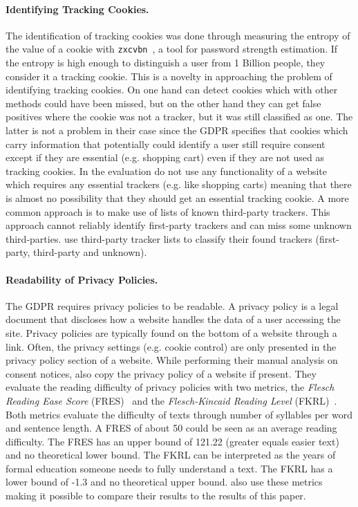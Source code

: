 \paragraph{Identifying Tracking Cookies.}
The identification of tracking cookies was done through measuring the entropy of the value of a cookie with
\texttt{zxcvbn}~\cite{wheeler2016zxcvbn}, a tool for password strength estimation.
If the entropy is high enough to distinguish a user from 1 Billion people, they
consider it a tracking cookie. This is a novelty in approaching the problem of identifying tracking cookies.
On one hand \citeauthor{sanchez2019} can detect cookies which with other methods could have been missed, but on the
other hand they can get false positives
where the cookie was not a tracker, but it was still classified as one. The latter is not a problem in their case since the
GDPR specifies that cookies which carry information that potentially could identify a user still require consent except if
they are essential (e.g. shopping cart) even if they are not used as tracking cookies. In the evaluation
\citeauthor{sanchez2019can} do not use any functionality of a
website which requires any essential trackers (e.g. like shopping carts) meaning that there is almost no possibility
that they should get an essential tracking cookie.
A more common approach is to make use of lists of known third-party trackers. This approach cannot reliably identify
first-party trackers and can miss some unknown third-parties. \citeauthor{sanchez2019can} use third-party tracker lists
to classify their found trackers (first-party, third-party and unknown).

\paragraph{Readability of Privacy Policies.}
The GDPR requires privacy policies to be readable. A privacy policy is a legal document that discloses how
a website handles the data of a user accessing the site. Privacy policies are typically found on the bottom
of a website through a link. Often, the privacy settings (e.g. cookie control) are only presented
in the privacy policy section of a website. While performing their manual analysis on consent notices,
\citeauthor{sanchez2019can} also copy the privacy policy of a website if present. They evaluate the reading difficulty of
privacy policies with
two metrics, the \emph{Flesch Reading Ease Score} (FRES)~\cite{flesch1948new} and the \emph{Flesch-Kincaid Reading
Level} (FKRL)~\cite{kincaid1975derivation}. Both metrics evaluate the difficulty of texts through number of syllables
per word and sentence length. A FRES of about 50 could be seen as an average reading difficulty. The FRES has an upper
bound of 121.22 (greater equals easier text) and no theoretical lower bound. The FKRL can be interpreted as the years of
formal education someone needs to fully understand a text. The FKRL has a lower bound of -1.3 and no
theoretical upper bound.  also use these metrics making it possible to compare their results to the
results of this paper.

